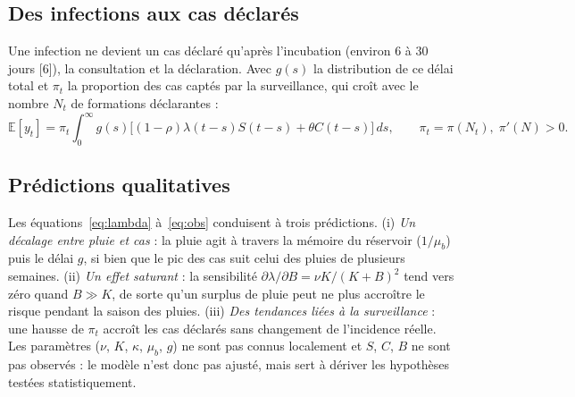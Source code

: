 \documentclass[11pt]{article}
\begin{document}
\subsection{Des infections aux cas déclarés}
Une infection ne devient un cas déclaré qu'après l'incubation (environ 6 à 30 jours [6]), la consultation et la déclaration. Avec $g(s)$ la distribution de ce délai total et $\pi_t$ la proportion des cas captés par la surveillance, qui croît avec le nombre $N_t$ de formations déclarantes :
\begin{equation}
\mathbb{E}[y_t]=\pi_t\int_0^{\infty}g(s)\big[(1-\rho)\lambda(t-s)S(t-s)+\theta C(t-s)\big]\,ds,\qquad \pi_t=\pi(N_t),\;\pi'(N)>0 .
\label{eq:obs}
\end{equation}

\subsection{Prédictions qualitatives}
Les équations~\eqref{eq:lambda} à~\eqref{eq:obs} conduisent à trois prédictions. (i) \textit{Un décalage entre pluie et cas} : la pluie agit à travers la mémoire du réservoir ($1/\mu_b$) puis le délai $g$, si bien que le pic des cas suit celui des pluies de plusieurs semaines. (ii) \textit{Un effet saturant} : la sensibilité $\partial\lambda/\partial B=\nu K/(K+B)^2$ tend vers zéro quand $B\gg K$, de sorte qu'un surplus de pluie peut ne plus accroître le risque pendant la saison des pluies. (iii) \textit{Des tendances liées à la surveillance} : une hausse de $\pi_t$ accroît les cas déclarés sans changement de l'incidence réelle. Les paramètres ($\nu$, $K$, $\kappa$, $\mu_b$, $g$) ne sont pas connus localement et $S$, $C$, $B$ ne sont pas observés : le modèle n'est donc pas ajusté, mais sert à dériver les hypothèses testées statistiquement.
\end{document}

